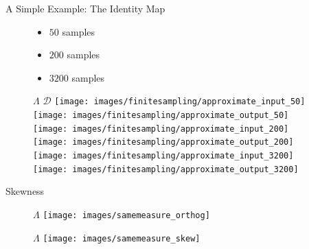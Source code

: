 \begin{frame}[t]{A Simple Example: The Identity Map}
\vspace{-10pt}
\begin{figure}
	\begin{minipage}{.3\textwidth}
		\begin{itemize}
			\item $50$ samples
			\vskip 60pt
			\item $200$ samples
			\vskip 60pt
			\item $3200$ samples
		\end{itemize}
	\end{minipage}
	\begin{minipage}{.55\textwidth}
		\centering
    		$\Lambda$ \hskip 80pt $\mathcal{D}$
    		\vskip 0pt
    		\texttt{[image: images/finitesampling/approximate\_input\_50]}
			\texttt{[image: images/finitesampling/approximate\_output\_50]}\\
		\texttt{[image: images/finitesampling/approximate\_input\_200]}
			\texttt{[image: images/finitesampling/approximate\_output\_200]}\\
		\texttt{[image: images/finitesampling/approximate\_input\_3200]}
			\texttt{[image: images/finitesampling/approximate\_output\_3200]}\\
	\end{minipage}
\end{figure}

\end{frame}


\begin{frame}[t]{Skewness}

\begin{figure}
    \begin{minipage}{.5\textwidth}
    	\centering
    	$\Lambda$
    	\vskip 0pt
    	\texttt{[image: images/samemeasure\_orthog]}\\
    	\vskip 0pt
    \end{minipage}%
    \begin{minipage}{.5\textwidth}
    \centering
    	$\Lambda$
    	\vskip 0pt
    	\texttt{[image: images/samemeasure\_skew]}
        \vskip 0pt
    \end{minipage}
\end{figure}


\end{frame}


